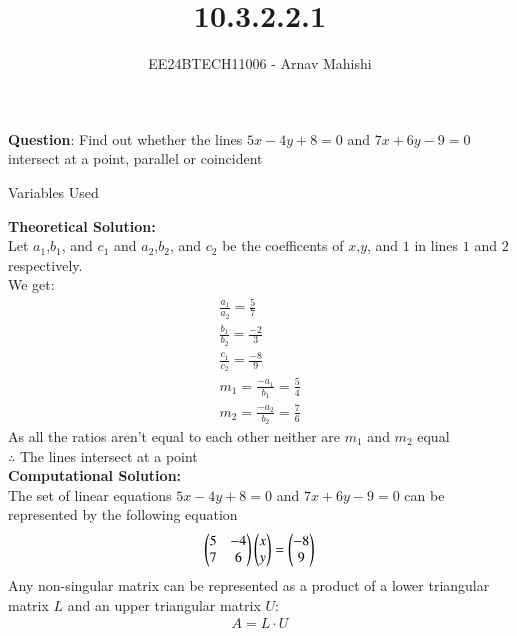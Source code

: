 \documentclass[journal]{IEEEtran}
\begin{document}

\vspace{3cm}

\title{10.3.2.2.1}
\author{EE24BTECH11006 - Arnav Mahishi}
{\let\newpage\relax\maketitle}

\renewcommand{\thefigure}{\theenumi}
\renewcommand{\thetable}{\theenumi}
\setlength{\intextsep}{10pt} %


\renewcommand{\thetable}{\theenumi}


\textbf{Question}:\newline
Find out whether the lines $5x-4y+8=0$ and $7x+6y-9=0$ intersect at a point, parallel or coincident 
\newline
\begin{table}[h!]    
  \centering
  
  \caption{Variables Used}
  \label{tab1.1.2.2}
\end{table}
\newline
\textbf{Theoretical Solution:}\\
Let $a_1$,$b_1$, and $c_1$ and $a_2$,$b_2$, and $c_2$ be the coefficents of $x$,$y$, and $1$ in lines $1$ and $2$ respectively.\\
We get:
\begin{align}
    \frac{a_1}{a_2}=\frac{5}{7}\\
    \frac{b_1}{b_2}=\frac{-2}{3}\\
    \frac{c_1}{c_2}=\frac{-8}{9}\\
    m_1=\frac{-a_1}{b_1}=\frac{5}{4}\\
    m_2=\frac{-a_2}{b_2}=\frac{7}{6}
\end{align}
As all the ratios aren't equal to each other neither are $m_1$ and $m_2$ equal\\
$\therefore$ The lines intersect at a point\\
\textbf{Computational Solution:}\\
The set of linear equations $5x-4y+8=0$ and $7x+6y-9=0$ can be represented by the following equation
\begin{align}
    \begin{pmatrix}5&-4\\7&6\end{pmatrix}\begin{pmatrix}x\\y\end{pmatrix}=\begin{pmatrix}-8\\9\end{pmatrix}
\end{align}
Any non-singular matrix can be represented as a product of a lower triangular matrix $L$ and an
upper triangular matrix $U$:
\begin{align}
    A = L \cdot U
\end{align}
\end{document}
